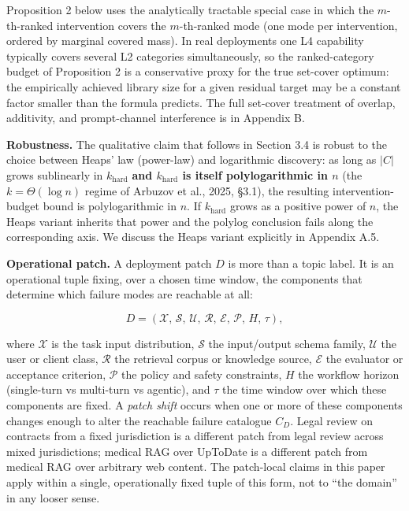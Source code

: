 \documentclass[
]{article}
\begin{document}
Proposition 2 below uses the analytically tractable special case in
which the \(m\)-th-ranked intervention covers the \(m\)-th-ranked mode
(one mode per intervention, ordered by marginal covered mass). In real
deployments one L4 capability typically covers several L2 categories
simultaneously, so the ranked-category budget of Proposition 2 is a
conservative proxy for the true set-cover optimum: the empirically
achieved library size for a given residual target may be a constant
factor smaller than the formula predicts. The full set-cover treatment
of overlap, additivity, and prompt-channel interference is in Appendix
B.

\textbf{Robustness.} The qualitative claim that follows in Section 3.4
is robust to the choice between Heaps' law (power-law) and logarithmic
discovery: as long as \(|C|\) grows sublinearly in \(k_{\text{hard}}\)
\textbf{and \(k_{\text{hard}}\) is itself polylogarithmic in \(n\)} (the
\(k = \Theta(\log n)\) regime of Arbuzov et al., 2025, §3.1), the
resulting intervention-budget bound is polylogarithmic in \(n\). If
\(k_{\text{hard}}\) grows as a positive power of \(n\), the Heaps
variant inherits that power and the polylog conclusion fails along the
corresponding axis. We discuss the Heaps variant explicitly in Appendix
A.5.

\textbf{Operational patch.} A deployment patch \(D\) is more than a
topic label. It is an operational tuple fixing, over a chosen time
window, the components that determine which failure modes are reachable
at all:

\[
D = (\mathcal{X},\, \mathcal{S},\, \mathcal{U},\, \mathcal{R},\, \mathcal{E},\, \mathcal{P},\, H,\, \tau),
\]

where \(\mathcal{X}\) is the task input distribution, \(\mathcal{S}\)
the input/output schema family, \(\mathcal{U}\) the user or client
class, \(\mathcal{R}\) the retrieval corpus or knowledge source,
\(\mathcal{E}\) the evaluator or acceptance criterion, \(\mathcal{P}\)
the policy and safety constraints, \(H\) the workflow horizon
(single-turn vs multi-turn vs agentic), and \(\tau\) the time window
over which these components are fixed. A \emph{patch shift} occurs when
one or more of these components changes enough to alter the reachable
failure catalogue \(C_D\). Legal review on contracts from a fixed
jurisdiction is a different patch from legal review across mixed
jurisdictions; medical RAG over UpToDate is a different patch from
medical RAG over arbitrary web content. The patch-local claims in this
paper apply within a single, operationally fixed tuple of this form, not
to ``the domain'' in any looser sense.
\end{document}
